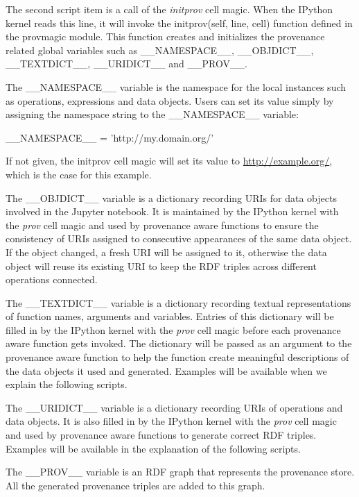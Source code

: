 The second script item is a call of the \emph{initprov} cell magic. When the IPython kernel reads this line, it will invoke the initprov(self, line, cell) function defined in the provmagic module. This function creates and initializes the provenance related global variables such as \_\_NAMESPACE\_\_, \_\_OBJDICT\_\_, \_\_TEXTDICT\_\_, \_\_URIDICT\_\_ and \_\_PROV\_\_. 

The \_\_NAMESPACE\_\_ variable is the namespace for the local instances such as operations, expressions and data objects. Users can set its value simply by assigning the namespace string to the \_\_NAMESPACE\_\_ variable:

\_\_NAMESPACE\_\_ = 'http://my.domain.org/'

If not given, the initprov cell magic will set its value to \url{http://example.org/}, which is the case for this example.

The \_\_OBJDICT\_\_ variable is a dictionary recording URIs for data objects involved in the Jupyter notebook. It is maintained by the IPython kernel with the \emph{prov} cell magic and used by provenance aware functions to ensure the consistency of URIs assigned to consecutive appearances of the same data object. If the object changed, a fresh URI will be assigned to it, otherwise the data object will reuse its existing URI to keep the RDF triples across different operations connected.

The \_\_TEXTDICT\_\_ variable is a dictionary recording textual representations of function names, arguments and variables. Entries of this dictionary will be filled in by the IPython kernel with the \emph{prov} cell magic before each provenance aware function gets invoked. The dictionary will be passed as an argument to the provenance aware function to help the function create meaningful descriptions of the data objects it used and generated. Examples will be available when we explain the following scripts.

The \_\_URIDICT\_\_ variable is a dictionary recording URIs of operations and data objects. It is also filled in by the IPython kernel with the \emph{prov} cell magic and used by provenance aware functions to generate correct RDF triples. Examples will be available in the explanation of the following scripts.

The \_\_PROV\_\_ variable is an RDF graph that represents the provenance store. All the generated provenance triples are added to this graph.

